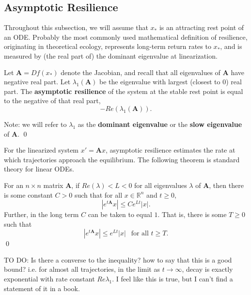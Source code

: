 \subsection{Asymptotic Resilience}
\label{sec:asymp_res}

Throughout this subsection, we will assume that $x_\ast$ is an attracting rest point of an ODE. Probably the most commonly used mathematical definition of resilience,  originating in theoretical ecology, represents long-term return rates to $x_{\ast}$, and is measured by (the real part of) the dominant eigenvalue at linearization. 

\begin{definition}
	\label{def:asymp}
	 Let $\textbf{A} = Df(x_\ast)$ denote the Jacobian, and recall that all eigenvalues of $\mathbf{A}$ have negative real part. Let $\lambda_1(\textbf{A})$ be the eigenvalue with largest (closest to 0) real part. 	The \textbf{asymptotic resilience} of the system at the stable rest point is equal to the negative of that real part, $$-Re(\lambda_1(\textbf{A})).$$

Note: we will refer to $\lambda_1$ as the \textbf{dominant eigenvalue} or the \textbf{slow eigenvalue} of $\mathbf{A}$. 
	 \qed 
\end{definition}

For the linearized system $x'= \textbf{A}x$, asymptotic resilience estimates the rate at which trajectories approach the equilibrium. The following theorem is standard theory for linear ODEs. %


\begin{theorem}
	For an $n \times n$ matrix $\mathbf{A}$, if $Re(\lambda) < L < 0$ for all eigenvalues $\lambda$ of $\mathbf{A}$, then there is some constant $C>0$ such that for all $x \in \mathbb{R}^n$ and $t \geq 0$,
	$$|e^{t\mathbf{A}}x| \leq Ce^{L t}|x|.$$ 
	Further, in the long term $C$ can be taken to equal $1$. That is, there is some $T \geq 0$ such that
	$$|e^{t\mathbf{A}}x| \leq e^{L t}|x| ~ ~\text{ for all } t \geq T.$$
	 \qed
\end{theorem}

TO DO: Is there a converse to the inequality? how to say that this is a good bound? i.e. for almost all trajectories, in the limit as $t\to \infty$, decay is exactly exponential with rate constant $Re{\lambda_1}$. I feel like this is true, but I can't find a statement of it in a book. 

